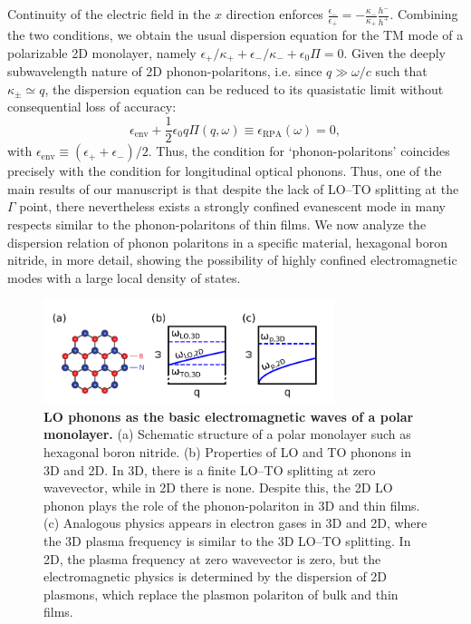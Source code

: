 \documentclass[aps,prb,twocolumn,
	           groupedaddress,superscriptaddress,
               amsfonts,amssymb,amsmath,floatfix,
	           citeautoscript]{revtex4-1}
\makeatletter
\newcommand{\ie}{i.e.\@\xspace} %
\newcommand{\comment}[2]{%
    \ifbool{togglecomments}%
    {\textcolor{blue!70!black}{\small\textsf{%
    \textsuperscript{\textsc{\textsf{\MakeLowercase{#1}}}}%
    [#2]}}} %
    {}}     %
\makeatother
\begin{document}
Continuity of the electric field in the $x$ direction enforces $\frac{\epsilon_-}{\epsilon_+} = -\frac{\kappa_-}{\kappa_+}\frac{h^-}{h^+}$. 
Combining the two conditions, we obtain the usual dispersion equation for the TM mode of a polarizable 2D monolayer, namely $\epsilon_+/\kappa_+ + \epsilon_-/\kappa_- +\epsilon_0\Pi=0$. Given the deeply subwavelength nature of 2D phonon-polaritons, \ie since $q\gg\omega/c$ such that $\kappa_{\pm}\simeq q$, the dispersion equation can be reduced to its quasistatic limit without consequential loss of accuracy:
\begin{equation}
    \epsilon_{\mathrm{env}} + \frac{1}{2}\epsilon_0 q \Pi(q,\omega) \equiv \epsilon_{\mathrm{RPA}}(\omega) = 0,
    \label{eq:dispeq}
\end{equation}
with $\epsilon_{\mathrm{env}}\equiv (\epsilon_++\epsilon_-)/2$. Thus, the condition for `phonon-polaritons' coincides precisely with the condition for longitudinal optical phonons.  Thus, one of the main results of our manuscript is that despite the lack of LO--TO splitting at the $\Gamma$ point, there nevertheless exists a strongly confined evanescent mode in many respects similar to the phonon-polaritons of thin films. We now analyze the dispersion relation of phonon polaritons in a specific material, hexagonal boron nitride, in more detail, showing the possibility of highly confined electromagnetic modes with a large local density of states. 

\begin{figure}[t]
    \includegraphics[width=85mm]{fig1.pdf}
    \caption{%
        \textbf{LO phonons as the basic electromagnetic waves of a polar monolayer.} (a) Schematic structure of a polar monolayer such as hexagonal boron nitride. (b) Properties of LO and TO phonons in 3D and 2D. In 3D, there is a finite LO--TO splitting at zero wavevector, while in 2D there is none. Despite this, the 2D LO phonon plays the role of the phonon-polariton in 3D and thin films. (c) Analogous physics appears in electron gases in 3D and 2D, where the 3D plasma frequency is similar to the 3D LO--TO splitting. In 2D, the plasma frequency at zero wavevector is zero, but the electromagnetic physics is determined by the dispersion of 2D plasmons, which replace the plasmon polariton of bulk and thin films.
        \label{fig:1}
        }
\end{figure}~
\end{document}
